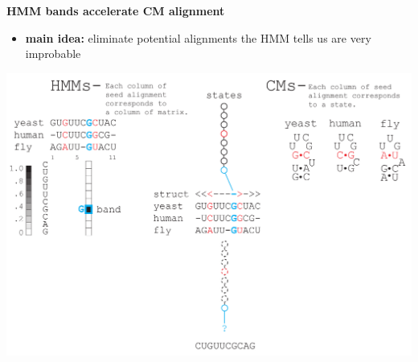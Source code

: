 \documentclass[landscape]{slides}
\begin{document}
\begin{slide}
\begin{center}

\textbf{HMM bands accelerate CM alignment}
\end{center}
\medskip
\small
\begin{itemize}
\item
\textbf{main idea:} eliminate potential alignments the HMM tells us are very improbable
\end{itemize}
\begin{center}
\includegraphics[width=8in]{figs/post_hmm_to_cm_map2_layer12}
\end{center}
\vfill
\end{slide}
\end{document}
